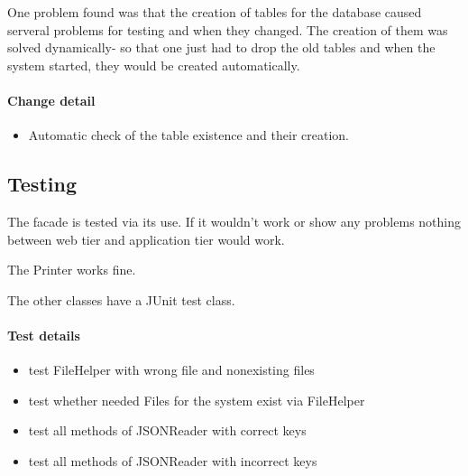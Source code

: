 One problem found was that the creation of tables for the database caused serveral problems
for testing and when they changed. The creation of them was solved dynamically- so
that one just had to drop the old tables and when the system started, they would be created automatically.

\paragraph{Change detail}
\begin{itemize}
  \item Automatic check of the table existence and their creation.
\end{itemize}


\subsection{Testing}
The facade is tested via its use. If it wouldn't work or show any problems
nothing between web tier and application tier would work.

The Printer works fine.

The other classes have a JUnit test class.
\paragraph{Test details}
\begin{itemize}
  \item test FileHelper with wrong file and nonexisting files
  \item test whether needed Files for the system exist via FileHelper
  \item test all methods of JSONReader with correct keys
  \item test all methods of JSONReader with incorrect keys
\end{itemize}




